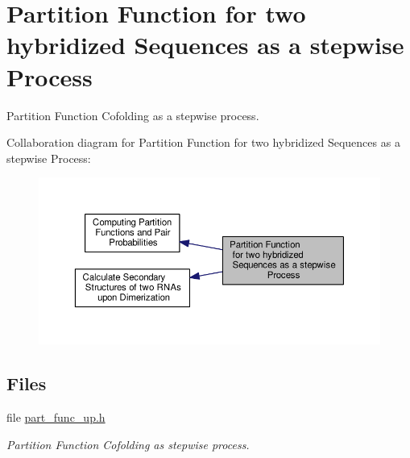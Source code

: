 \hypertarget{group__up__cofold}{\section{Partition Function for two hybridized Sequences as a stepwise Process}
\label{group__up__cofold}
}


Partition Function Cofolding as a stepwise process.  


Collaboration diagram for Partition Function for two hybridized Sequences as a stepwise Process\+:
\nopagebreak
\begin{figure}[H]
\begin{center}
\leavevmode
\includegraphics[width=350pt]{group__up__cofold}
\end{center}
\end{figure}
\subsection*{Files}
\begin{DoxyCompactItemize}
\item 
file \hyperlink{part__func__up_8h}{part\+\_\+func\+\_\+up.\+h}
\begin{DoxyCompactList}\small\item\em Partition Function Cofolding as stepwise process. \end{DoxyCompactList}\end{DoxyCompactItemize}
